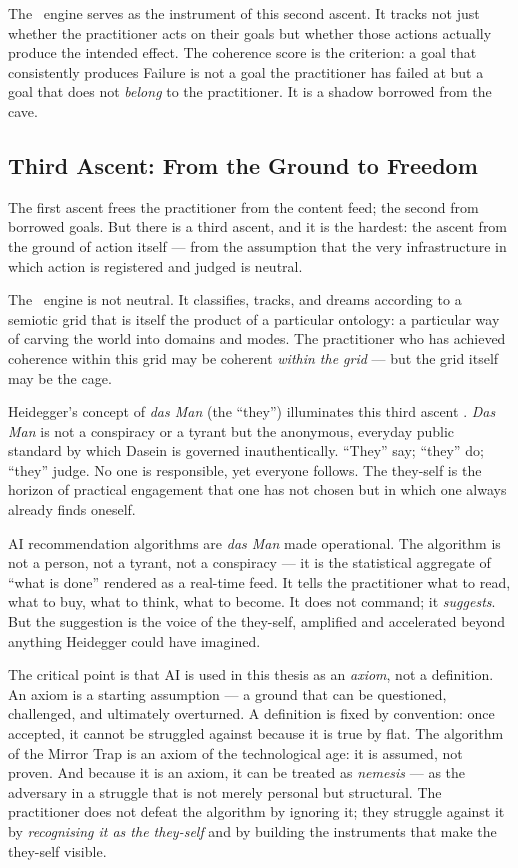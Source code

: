 The \physis\ engine serves as the instrument of this second ascent. It tracks
not just whether the practitioner acts on their goals but whether those actions
actually produce the intended effect. The coherence score is the criterion: a
goal that consistently produces Failure is not a goal the practitioner has
failed at but a goal that does not \emph{belong} to the practitioner. It is a
shadow borrowed from the cave.

\subsection{Third Ascent: From the Ground to Freedom}

The first ascent frees the practitioner from the content feed; the second from
borrowed goals. But there is a third ascent, and it is the hardest: the ascent
from the ground of action itself --- from the assumption that the very
infrastructure in which action is registered and judged is neutral.

The \physis\ engine is not neutral. It classifies, tracks, and dreams according
to a semiotic grid that is itself the product of a particular ontology: a
particular way of carving the world into domains and modes. The practitioner who
has achieved coherence within this grid may be coherent \emph{within the grid}
--- but the grid itself may be the cage.

Heidegger's concept of \emph{das Man} (the ``they'') illuminates this third
ascent \parencite[§27]{heidegger1962being}. \emph{Das Man} is not a conspiracy
or a tyrant but the anonymous, everyday public standard by which Dasein is
governed inauthentically. ``They'' say; ``they'' do; ``they'' judge. No one is
responsible, yet everyone follows. The they-self is the horizon of practical
engagement that one has not chosen but in which one always already finds
oneself.

AI recommendation algorithms are \emph{das Man} made operational. The algorithm
is not a person, not a tyrant, not a conspiracy --- it is the statistical
aggregate of ``what is done'' rendered as a real-time feed. It tells the
practitioner what to read, what to buy, what to think, what to become. It does
not command; it \emph{suggests}. But the suggestion is the voice of the
they-self, amplified and accelerated beyond anything Heidegger could have
imagined.

The critical point is that AI is used in this thesis as an \emph{axiom}, not a
definition. An axiom is a starting assumption --- a ground that can be
questioned, challenged, and ultimately overturned. A definition is fixed by
convention: once accepted, it cannot be struggled against because it is true by
flat. The algorithm of the Mirror Trap is an axiom of the technological age: it
is assumed, not proven. And because it is an axiom, it can be treated as
\emph{nemesis} --- as the adversary in a struggle that is not merely personal
but structural. The practitioner does not defeat the algorithm by ignoring it;
they struggle against it by \emph{recognising it as the they-self} and by
building the instruments that make the they-self visible.

